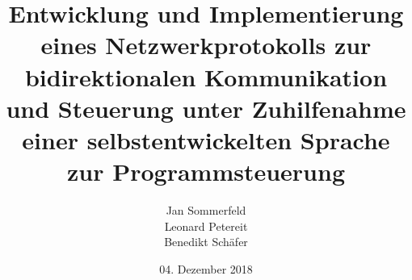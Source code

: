 \documentclass[12pt,a4paper]{scrartcl}
\begin{document}
\title{Entwicklung und Implementierung eines Netzwerkprotokolls zur bidirektionalen Kommunikation und Steuerung unter Zuhilfenahme einer selbstentwickelten Sprache zur Programmsteuerung}
\date{04. Dezember 2018}
\author{Jan Sommerfeld\\ Leonard Petereit\\ Benedikt Schäfer}
\maketitle
\tableofcontents
\newpage


%

\newpage



\newpage



\newpage 


\end{document}
